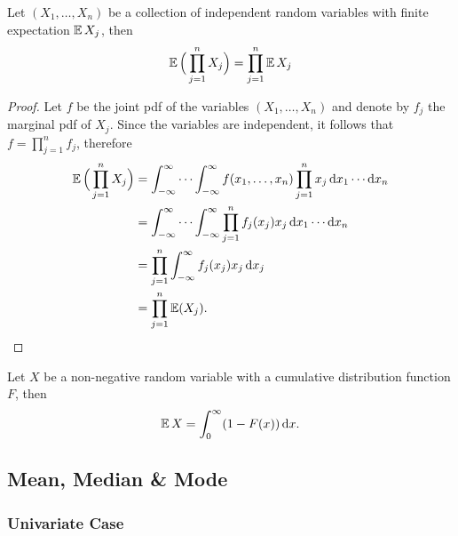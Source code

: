 \begin{proposition}
\label{prop:expected-value-distributes-under-multiplication}
Let \((X_1, \dots, X_n)\) be a collection of independent random variables with
finite expectation \(\operatorname{\mathbb{E}} X_j\), then
\[
\operatorname{\mathbb{E}}\Big( \prod_{j=1}^n X_j \Big) = \prod_{j=1}^n \operatorname{\mathbb{E}} X_j
\]
\end{proposition}

\begin{proof}
Let \(f\) be the joint pdf of the variables \((X_1, \dots, X_n)\) and denote by
\(f_j\) the marginal pdf of \(X_j\). Since the variables are independent, it
follows that \(f = \prod_{j=1}^n f_j\), therefore
\begin{align*}
  \operatorname{\mathbb{E}}\Big( \prod_{j=1}^n X_j \Big)
  &= \int_{-\infty}^{\infty} \cdots \int_{-\infty}^{\infty}
    f(x_1, \dots, x_n) \prod_{j=1}^n x_j\, \mathrm{d} x_1 \cdots \mathrm{d} x_n \\
  &= \int_{-\infty}^{\infty} \cdots \int_{-\infty}^{\infty}
    \prod_{j=1}^n f_j(x_j) x_j\, \mathrm{d} x_1 \cdots \mathrm{d} x_n \\
  &= \prod_{j=1}^n \int_{-\infty}^{\infty} f_j(x_j) x_j\, \mathrm{d} x_j \\
  &= \prod_{j=1}^n \operatorname{\mathbb{E}}(X_j).
\end{align*}
\end{proof}

\begin{proposition}
\label{prop:expectation-nonnegative-random-variable}
Let \(X\) be a non-negative random variable with a cumulative distribution
function \(F\), then
\[
\operatorname{\mathbb{E}} X = \int_0^{\infty} (1 - F(x))\, \mathrm{d} x.
\]
\end{proposition}


\subsection{Mean, Median \& Mode}

\subsubsection{Univariate Case}

